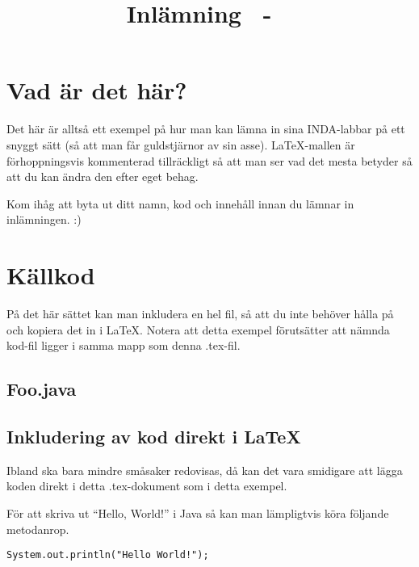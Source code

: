 \documentclass[a4paper,10pt,twoside]{article}
\title{Inlämning \homeworknumber\ - \course\ \coursename}
\date{\thedate}
\author{\theauthor}
\begin{document}

\clearpage
\thispagestyle{empty}
\mbox{} %
\clearpage 

\setcounter{page}{1}


\section{Vad är det här?}
\label{sec:vad_är_det_här}

Det här är alltså ett exempel på hur man kan lämna in sina INDA-labbar på ett snyggt sätt (så att man får guldstjärnor av sin asse). \LaTeX-mallen är förhoppningsvis kommenterad tillräckligt så att man ser vad det mesta betyder så att du kan ändra den efter eget behag. 

Kom ihåg att byta ut ditt namn, kod och innehåll innan du lämnar in inlämningen. :)

\section{Källkod}
\label{sec:källkod}

På det här sättet kan man inkludera en hel fil, så att du inte behöver hålla på och kopiera det in i \LaTeX. Notera att detta exempel förutsätter att nämnda kod-fil ligger i samma mapp som denna .tex-fil. 

\subsection{Foo.java}
\label{sec:Foo_java} %

\subsection{Inkludering av kod direkt i \LaTeX}

Ibland ska bara mindre småsaker redovisas, då kan det vara smidigare att lägga koden direkt i detta .tex-dokument som i detta exempel.

För att skriva ut ``Hello, World!'' i Java så kan man lämpligtvis köra följande metodanrop.

\begin{lstlisting}
System.out.println("Hello World!");
\end{lstlisting}
\end{document}
